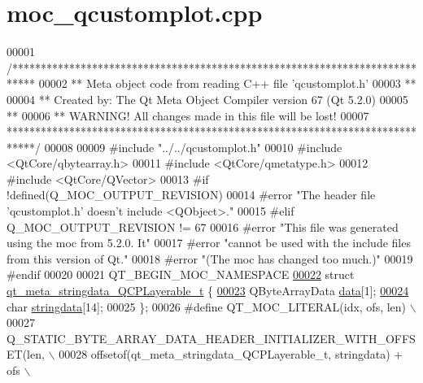 \hypertarget{a00067_source}{\section{moc\+\_\+qcustomplot.\+cpp}
\label{a00067_source}
}

\begin{DoxyCode}
00001 \textcolor{comment}{/****************************************************************************}
00002 \textcolor{comment}{** Meta object code from reading C++ file 'qcustomplot.h'}
00003 \textcolor{comment}{**}
00004 \textcolor{comment}{** Created by: The Qt Meta Object Compiler version 67 (Qt 5.2.0)}
00005 \textcolor{comment}{**}
00006 \textcolor{comment}{** WARNING! All changes made in this file will be lost!}
00007 \textcolor{comment}{*****************************************************************************/}
00008 
00009 \textcolor{preprocessor}{#include "../../qcustomplot.h"}
00010 \textcolor{preprocessor}{#include <QtCore/qbytearray.h>}
00011 \textcolor{preprocessor}{#include <QtCore/qmetatype.h>}
00012 \textcolor{preprocessor}{#include <QtCore/QVector>}
00013 \textcolor{preprocessor}{#if !defined(Q\_MOC\_OUTPUT\_REVISION)}
00014 \textcolor{preprocessor}{#error "The header file 'qcustomplot.h' doesn't include <QObject>."}
00015 \textcolor{preprocessor}{#elif Q\_MOC\_OUTPUT\_REVISION != 67}
00016 \textcolor{preprocessor}{#error "This file was generated using the moc from 5.2.0. It"}
00017 \textcolor{preprocessor}{#error "cannot be used with the include files from this version of Qt."}
00018 \textcolor{preprocessor}{#error "(The moc has changed too much.)"}
00019 \textcolor{preprocessor}{#endif}
00020 
00021 QT\_BEGIN\_MOC\_NAMESPACE
\hypertarget{a00067_source_l00022}{}\hyperlink{a00067}{00022} \textcolor{keyword}{struct }\hyperlink{a00067_de/dd2/a00207}{qt\_meta\_stringdata\_QCPLayerable\_t} \{
\hypertarget{a00067_source_l00023}{}\hyperlink{a00067_a08a4a1de23442a83952a11d68453ab4d}{00023}     QByteArrayData \hyperlink{a00067_a08a4a1de23442a83952a11d68453ab4d}{data}[1];
\hypertarget{a00067_source_l00024}{}\hyperlink{a00067_a4dff397c178a0aa24e1087e6ab89c187}{00024}     \textcolor{keywordtype}{char} \hyperlink{a00067_a4dff397c178a0aa24e1087e6ab89c187}{stringdata}[14];
00025 \};
00026 \textcolor{preprocessor}{#define QT\_MOC\_LITERAL(idx, ofs, len) \(\backslash\)}
00027 \textcolor{preprocessor}{    Q\_STATIC\_BYTE\_ARRAY\_DATA\_HEADER\_INITIALIZER\_WITH\_OFFSET(len, \(\backslash\)}
00028 \textcolor{preprocessor}{    offsetof(qt\_meta\_stringdata\_QCPLayerable\_t, stringdata) + ofs \(\backslash\)}

\end{DoxyCode}
